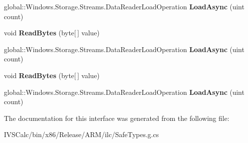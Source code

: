 \begin{DoxyCompactItemize}
global\+::\+Windows.\+Storage.\+Streams.\+Data\+Reader\+Load\+Operation {\bfseries Load\+Async} (uint count)
\item 
\mbox{\label{interface_windows_1_1_storage_1_1_streams_1_1_i_data_reader_aa8d3357fa7e015528178edd08636be86}} 
void {\bfseries Read\+Bytes} (byte\mbox{[}$\,$\mbox{]} value)
\item 
\mbox{\label{interface_windows_1_1_storage_1_1_streams_1_1_i_data_reader_a8588ac09a57e03e1696d0707335bcb2b}} 
global\+::\+Windows.\+Storage.\+Streams.\+Data\+Reader\+Load\+Operation {\bfseries Load\+Async} (uint count)
\item 
\mbox{\label{interface_windows_1_1_storage_1_1_streams_1_1_i_data_reader_aa8d3357fa7e015528178edd08636be86}} 
void {\bfseries Read\+Bytes} (byte\mbox{[}$\,$\mbox{]} value)
\item 
\mbox{\label{interface_windows_1_1_storage_1_1_streams_1_1_i_data_reader_a8588ac09a57e03e1696d0707335bcb2b}} 
global\+::\+Windows.\+Storage.\+Streams.\+Data\+Reader\+Load\+Operation {\bfseries Load\+Async} (uint count)
\end{DoxyCompactItemize}


The documentation for this interface was generated from the following file\+:\begin{DoxyCompactItemize}
\item 
I\+V\+S\+Calc/bin/x86/\+Release/\+A\+R\+M/ilc/Safe\+Types.\+g.\+cs\end{DoxyCompactItemize}
